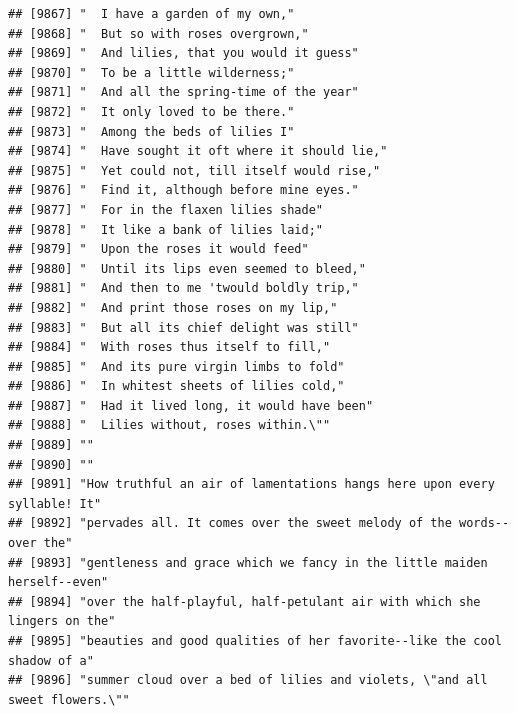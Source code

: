 \documentclass{article}\usepackage[]{graphicx}\usepackage[]{color}
\makeatletter
\newenvironment{kframe}{%
 \def\at@end@of@kframe{}%
 \ifinner\ifhmode%
  \def\at@end@of@kframe{\end{minipage}}%
  \begin{minipage}{\columnwidth}%
 \fi\fi%
 \def\FrameCommand##1{\hskip\@totalleftmargin \hskip-\fboxsep
 \colorbox{shadecolor}{##1}\hskip-\fboxsep
     \hskip-\linewidth \hskip-\@totalleftmargin \hskip\columnwidth}%
 \MakeFramed {\advance\hsize-\width
   \@totalleftmargin\z@ \linewidth\hsize
   \@setminipage}}%
 {\par\unskip\endMakeFramed%
 \at@end@of@kframe}
\newenvironment{knitrout}{}{} %
\makeatother
\begin{document}
\begin{knitrout}
\begin{kframe}
\begin{verbatim}
## [9867] "  I have a garden of my own,"                                                
## [9868] "  But so with roses overgrown,"                                              
## [9869] "  And lilies, that you would it guess"                                       
## [9870] "  To be a little wilderness;"                                                
## [9871] "  And all the spring-time of the year"                                       
## [9872] "  It only loved to be there."                                                
## [9873] "  Among the beds of lilies I"                                                
## [9874] "  Have sought it oft where it should lie,"                                   
## [9875] "  Yet could not, till itself would rise,"                                    
## [9876] "  Find it, although before mine eyes."                                       
## [9877] "  For in the flaxen lilies shade"                                            
## [9878] "  It like a bank of lilies laid;"                                            
## [9879] "  Upon the roses it would feed"                                              
## [9880] "  Until its lips even seemed to bleed,"                                      
## [9881] "  And then to me 'twould boldly trip,"                                       
## [9882] "  And print those roses on my lip,"                                          
## [9883] "  But all its chief delight was still"                                       
## [9884] "  With roses thus itself to fill,"                                           
## [9885] "  And its pure virgin limbs to fold"                                         
## [9886] "  In whitest sheets of lilies cold,"                                         
## [9887] "  Had it lived long, it would have been"                                     
## [9888] "  Lilies without, roses within.\""                                           
## [9889] ""                                                                            
## [9890] ""                                                                            
## [9891] "How truthful an air of lamentations hangs here upon every syllable! It"      
## [9892] "pervades all. It comes over the sweet melody of the words--over the"         
## [9893] "gentleness and grace which we fancy in the little maiden herself--even"      
## [9894] "over the half-playful, half-petulant air with which she lingers on the"      
## [9895] "beauties and good qualities of her favorite--like the cool shadow of a"      
## [9896] "summer cloud over a bed of lilies and violets, \"and all sweet flowers.\""   

\end{verbatim}
\end{kframe}
\end{knitrout}
\end{document}
